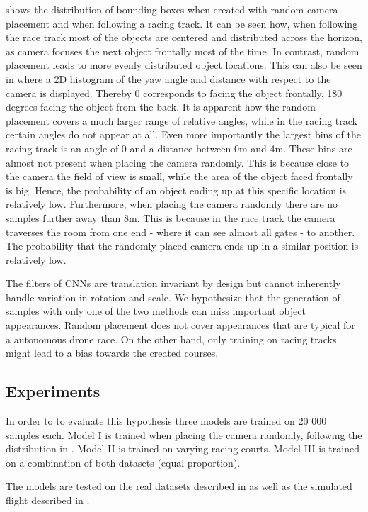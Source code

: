 shows the distribution of bounding boxes when created with random camera placement and when following a racing track. It can be seen how, when following the race track most of the objects are centered and distributed across the horizon, as camera focuses the next object frontally most of the time. In contrast, random placement leads to more evenly distributed object locations. This can also be seen in  where a 2D histogram of the yaw angle and distance with respect to the camera is displayed. Thereby 0 corresponds to facing the object frontally, 180 degrees facing the object from the back. It is apparent how the random placement covers a much larger range of relative angles, while in the racing track certain angles do not appear at all. Even more importantly the largest bins of the racing track is an angle of 0 and a distance between 0m and 4m. These bins are almost not present when placing the camera randomly. This is because close to the camera the field of view is small, while the area of the object faced frontally is big. Hence, the probability of an object ending up at this specific location is relatively low. Furthermore, when placing the camera randomly there are no samples further away than 8m. This is because in the race track the camera traverses the room from one end - where it can see almost all gates - to another. The probability that the randomly placed camera ends up in a similar position is relatively low.

The filters of \acp{CNN} are translation invariant by design but cannot inherently handle variation in rotation and scale. We hypothesize that the generation of samples with only one of the two methods can miss important object appearances. Random placement does not cover appearances that are typical for a autonomous drone race. On the other hand, only training on racing tracks might lead to a bias towards the created courses.

\subsection{Experiments}

In order to to evaluate this hypothesis three models are trained on 20 000 samples each. Model I is trained when placing the camera randomly, following the distribution in . Model II is trained on varying racing courts. Model III is trained on a combination of both datasets (equal proportion).

The models are tested on the real datasets described in  as well as the simulated flight described in .

